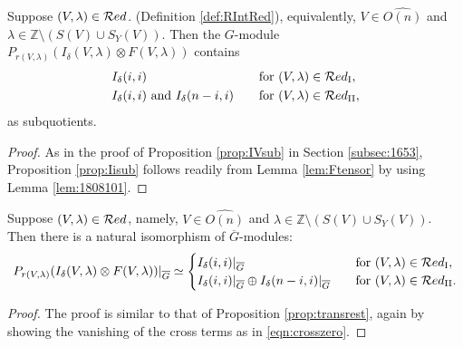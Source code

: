 \begin{proposition}
\label{prop:Iisub}
 Suppose $(V,\lambda) \in {\mathcal{R}}ed$.  
(Definition \ref{def:RIntRed}), 
equivalently,
 $V \in \widehat{O(n)}$
 and $\lambda \in {\mathbb{Z}}\setminus(S(V) \cup S_Y(V))$.  
Then the $G$-module
 $P_{r(V,\lambda)}(I_{\delta}(V,\lambda)
 \otimes F(V,\lambda))$ contains
\begin{alignat*}{2}
& I_{\delta}(i,i)
\quad
&&\text{for $(V,\lambda) \in {\mathcal{R}}ed_{\operatorname{I}}$}, 
\\
& \text{$I_{\delta}(i,i)$ and $I_{\delta}(n-i,i)$}
\quad
&&\text{for $(V,\lambda) \in {\mathcal{R}}ed_{\operatorname{I I}}$}, 
\end{alignat*}
as subquotients.  
\end{proposition}

\begin{proof}
As in the proof of Proposition \ref{prop:IVsub}
 in Section \ref{subsec:1653}, 
 Proposition \ref{prop:Iisub} follows readily from 
Lemma \ref{lem:Ftensor}
 by using Lemma \ref{lem:1808101}.  
\end{proof}


\begin{proposition}
\label{prop:PIFrest}
Suppose $(V,\lambda) \in {\mathcal{R}}ed$, namely,
 $V \in \widehat{O(n)}$
 and $\lambda \in {\mathbb{Z}} \setminus (S(V) \cup S_Y(V))$.  
Then there is a natural isomorphism
 of $\overline G$-modules:
\begin{equation*}
P_{r(V,\lambda)}(I_{\delta}(V,\lambda)
 \otimes F(V,\lambda))|_{\overline G}
 \simeq
\begin{cases}
I_{\delta}(i,i)|_{\overline G}
\quad
&
\text{for $(V,\lambda) \in {\mathcal{R}}ed_{\operatorname{I}}$}, 
\\
I_{\delta}(i,i)|_{\overline G} \oplus I_{\delta}(n-i,i)|_{\overline G}
\quad
&
\text{for $(V,\lambda) \in {\mathcal{R}}ed_{\operatorname{I I}}$}.  
\end{cases}
\end{equation*}
\end{proposition}

\begin{proof}
The proof is similar to that of Proposition \ref{prop:transrest}, 
 again by showing the vanishing of the cross terms
 as in \eqref{eqn:crosszero}.  
\end{proof}

